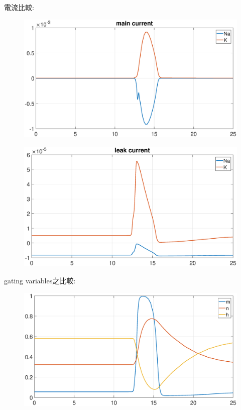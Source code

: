 \documentclass[12pt,a4paper]{article}
\begin{document}
\begin{CJK}{UTF8}{bsmi}
\begin{enumerate}
\begin{figure}[htbp]
			\end{figure}
			\newpage
			電流比較:\\
			\begin{figure}[htbp]
				\centering
				\includegraphics[width = 500pt]{main2.eps}
			\end{figure}
			\begin{figure}[htbp]
				\centering
				\includegraphics[width = 500pt]{leak2.eps}
			\end{figure}
			\newpage
			gating variables之比較:\\
			\begin{figure}[htbp]
				\centering
				\includegraphics[width = 500pt]{mnh2.eps}

\end{figure}
\end{enumerate}
\end{CJK}
\end{document}
